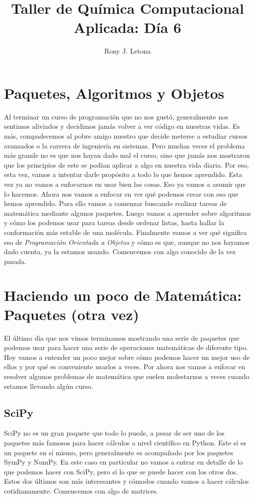 \documentclass[10pt,letterpaper]{article}
\author{Rony J. Letona}
\title{Taller de Qu\'imica Computacional Aplicada: D\'ia 6}
\begin{document}
\maketitle

\section{Paquetes, Algoritmos y Objetos}
Al terminar un curso de programaci\'on que no nos gust\'o, generalmente nos sentimos aliviados y decidimos jam\'as volver a ver c\'odigo en nuestras vidas. Es m\'as, compadecemos al pobre amigo nuestro que decide meterse a estudiar cursos avanzados o la carrera de ingenier\'ia en sistemas. Pero muchas veces el problema m\'as grande no es que nos hayan dado mal el curso, sino que jam\'as nos mostraron que los principios de este se pod\'ian aplicar a algo en nuestra vida diaria. Por eso, esta vez, vamos a intentar darle prop\'osito a todo lo que hemos aprendido. Esta vez ya no vamos a enfocarnos en usar bien las cosas. Eso ya vamos a asumir que lo hacemos. Ahora nos vamos a enfocar en ver qu\'e podemos crear con eso que hemos aprendido. Para ello vamos a comenzar buscando realizar tareas de matem\'atica mediante algunos paquetes. Luego vamos a aprender sobre algoritmos y c\'omo los podemos usar para tareas desde ordenar listas, hasta hallar la conformaci\'on m\'as estable de una mol\'ecula. Finalmente vamos a ver qu\'e significa eso de \emph{Programaci\'on Orientada a Objetos} y c\'omo es que, aunque no nos hayamos dado cuenta, ya la estamos usando. Comencemos con algo conocido de la vez pasada.

\section{Haciendo un poco de Matem\'atica: Paquetes (otra vez)}
El \'ultimo d\'ia que nos vimos terminamos mostrando una serie de paquetes que podemos usar para hacer una serie de operaciones matem\'aticas de diferente tipo. Hoy vamos a entender un poco mejor sobre c\'omo podemos hacer un mejor uso de ellos y por qu\'e es conveniente usarlos a veces. Por ahora nos vamos a enfocar en resolver algunos problemas de matem\'atica que suelen molestarnos a veces cuando estamos llevando alg\'un curso.

\subsection{SciPy}
SciPy no es un gran paquete que todo lo puede, a pesar de ser uno de los paquetes m\'as famosos para hacer c\'alculos a nivel cient\'ifico en Python. Este s\'i es un paquete en s\'i mismo, pero generalmente es acompa\~nado por los paquetes SymPy y NumPy. En este caso en particular no vamos a entrar en detalle de lo que podemos hacer con SciPy, pero s\'i lo que se puede hacer con los otros dos. Estos dos \'ultimos son m\'as interesantes y c\'omodos cuando vamos a hacer c\'alculos cotidianamente. Comencemos con algo de matrices.
\end{document}
